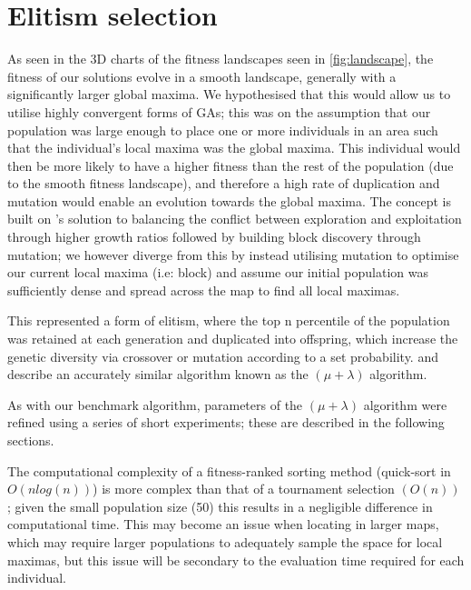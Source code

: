 \documentclass[authoryearcitations]{UoYCSproject}
\begin{document}
\section{Elitism selection}
\label{subsec:elitism_sel}
As seen in the 3D charts of the fitness landscapes seen in \autoref{fig:landscape}, the fitness of our solutions evolve in a smooth landscape, generally with a significantly larger global maxima. We hypothesised that this would allow us to utilise highly convergent forms of GAs; this was on the assumption that our population was large enough to place one or more individuals in an area such that the individual's local maxima was the global maxima. This individual would then be more likely to have a higher fitness than the rest of the population (due to the smooth fitness landscape), and therefore a high rate of duplication and mutation would enable an evolution towards the global maxima. The concept is built on \citet{David_E_Goldberg1991-es}'s solution to balancing the conflict between exploration and exploitation through higher growth ratios followed by building block discovery through mutation; we however diverge from this by instead utilising mutation to optimise our current local maxima (i.e: block) and assume our initial population was sufficiently dense and spread across the map to find all local maximas.
	
This represented a form of elitism, where the top n percentile of the population was retained at each generation and duplicated into offspring, which increase the genetic diversity via crossover or mutation according to a set probability. \citet{T_Back_D_B_Fogel_T_Michalewicz} and \citet{Shapiro1992-qm} describe an accurately similar algorithm known as the $(\mu + \lambda)$  algorithm.

As with our benchmark algorithm, parameters of the $(\mu + \lambda)$ algorithm were refined using a series of short experiments; these are described in the following sections.

The computational complexity of a fitness-ranked sorting method (quick-sort in $O(n log (n))$) is more complex  \cite{Mitchell1998-td} than that of a tournament selection $(O(n))$ \cite{David_E_Goldberg1991-es}; given the small population size (50) this results in a negligible difference in computational time. This may become an issue when locating in larger maps, which may require larger populations to adequately sample the space for local maximas, but this issue will be secondary to the evaluation time required for each individual.
\end{document}
